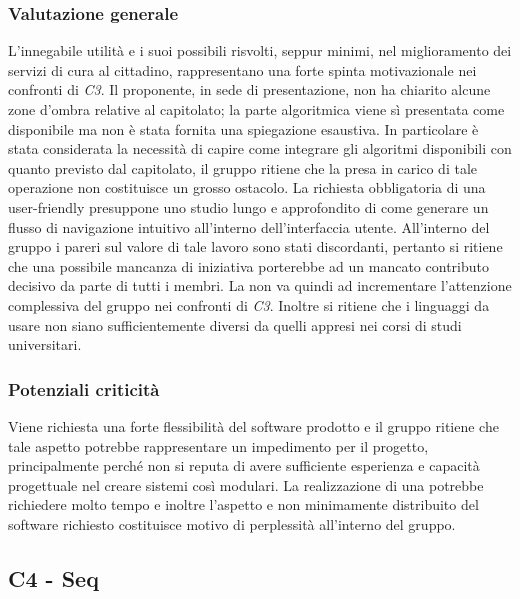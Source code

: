         \subsubsection{Valutazione generale}
        L'innegabile utilità e i suoi possibili risvolti, seppur minimi, nel miglioramento dei servizi di cura al cittadino, rappresentano una forte spinta motivazionale nei confronti di \emph{C3}. Il proponente, in sede di presentazione, non ha chiarito alcune zone d'ombra relative al capitolato; la parte algoritmica viene sì presentata come disponibile ma non è stata fornita una spiegazione esaustiva. In particolare è stata considerata la necessità di capire come integrare gli algoritmi disponibili con quanto previsto dal capitolato, il gruppo ritiene che la presa in carico di tale operazione non costituisce un grosso ostacolo. La richiesta obbligatoria di una   user-friendly presuppone uno studio lungo e approfondito di come generare un flusso di navigazione intuitivo all'interno dell'interfaccia utente. All'interno del gruppo i pareri sul valore di tale lavoro sono stati discordanti, pertanto si ritiene che una possibile mancanza di iniziativa porterebbe ad un mancato contributo decisivo da parte di tutti i membri. La   non va quindi ad incrementare l'attenzione complessiva del gruppo nei confronti di \emph{C3}. Inoltre si ritiene che i linguaggi da usare non siano sufficientemente diversi da quelli appresi nei corsi di studi universitari.
        \subsubsection{Potenziali criticità}
        Viene richiesta una forte flessibilità del software prodotto e il gruppo ritiene che tale aspetto potrebbe rappresentare un impedimento per il progetto, principalmente perché non si reputa di avere sufficiente esperienza e capacità progettuale nel creare sistemi così modulari. La realizzazione di una     potrebbe richiedere molto tempo e inoltre l'aspetto   e non minimamente distribuito del software richiesto costituisce motivo di perplessità all'interno del gruppo.
        
\subsection{C4 - Seq}
